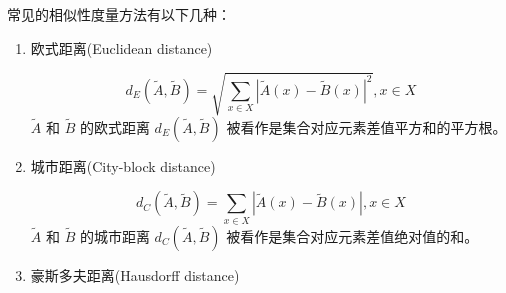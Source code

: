 常见的相似性度量方法有以下几种：
\begin{enumerate}[(1)]
    \item 欧式距离(Euclidean distance)

          \begin{equation}
              \label{equ:eucliden}
              d_E(\tilde{A}, \tilde{B}) = \sqrt{\sum_{x \in X} |\tilde{A}(x)-\tilde{B}(x)|^2 }, x \in X
          \end{equation}
          $\tilde{A}$ 和 $\tilde{B}$ 的欧式距离 $d_E(\tilde{A}, \tilde{B})$ 被看作是集合对应元素差值平方和的平方根。
    \item 城市距离(City-block distance)

          \begin{equation}
              \label{equ:cityblock}
              d_C(\tilde{A}, \tilde{B}) = \sum_{x \in X}|\tilde{A}(x)-\tilde{B}(x)| , x \in X
          \end{equation}
          $\tilde{A}$ 和 $\tilde{B}$ 的城市距离 $d_C(\tilde{A}, \tilde{B})$ 被看作是集合对应元素差值绝对值的和。

    \item 豪斯多夫距离(Hausdorff distance)


\end{enumerate}
